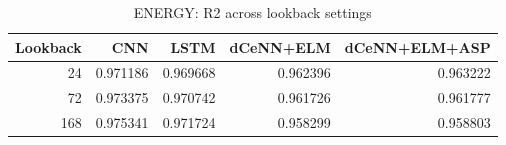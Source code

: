 \begin{table}
\caption{ENERGY: R2 across lookback settings}
\begin{tabular}{rrrrr}
\toprule
Lookback & CNN & LSTM & dCeNN+ELM & dCeNN+ELM+ASP \\
\midrule
24 & 0.971186 & 0.969668 & 0.962396 & 0.963222 \\
72 & 0.973375 & 0.970742 & 0.961726 & 0.961777 \\
168 & 0.975341 & 0.971724 & 0.958299 & 0.958803 \\
\bottomrule
\end{tabular}
\end{table}
